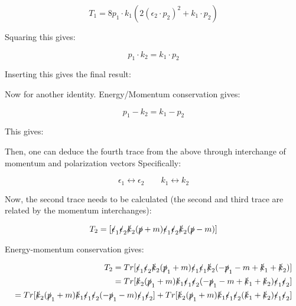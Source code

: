 \documentclass[a4]{article}
\begin{document}
    \begin{equation}
        T_1 = 8 p_1 \cdot k_1 (2 (\epsilon_2 \cdot p_2)^2 + k_1 \cdot p_2)
    \end{equation}

    Squaring this gives:

    \begin{equation}
        p_1 \cdot k_2 = k_1 \cdot p_2
    \end{equation}

    Inserting this gives the final result:

    \begin{center}
    \end{center}

    Now for another identity. Energy/Momentum conservation gives:

    \begin{equation}
        p_1 - k_2 = k_1 - p_2
    \end{equation}

    This gives:

    \begin{center}
    \end{center}

    Then, one can deduce the fourth trace from the above through interchange of momentum and polarization vectors Specifically:

    \[
        \epsilon_1 \leftrightarrow \epsilon_2 \qquad k_1 \leftrightarrow k_2
    \]

    Now, the second trace needs to be calculated (the second and third trace are related by the momentum interchanges):

    \begin{equation}
        T_2 = [\slashed{\epsilon}_1 \slashed{\epsilon}_2 \slashed{k}_2 (\slashed{p} + m) \slashed{\epsilon}_1 \slashed{\epsilon}_2 \slashed{k}_2 (\slashed{p} - m)]
    \end{equation}

    Energy-momentum conservation gives:

    \begin{eqnarray}
        T_2 = Tr [\slashed{\epsilon}_1 \slashed{\epsilon}_2 \slashed{k}_2 (\slashed{p}_1 + m) \slashed{\epsilon}_1 \slashed{\epsilon}_1 \slashed{k}_2 (- \slashed{p}_1 - m + \slashed{k}_1 + \slashed{k}_2)] \\
        = Tr [\slashed{k}_2 (\slashed{p}_1 + m) \slashed{k}_1 \slashed{\epsilon}_1 \slashed{\epsilon}_2 (- \slashed{p}_1 - m + \slashed{k}_1 + \slashed{k}_2) \slashed{\epsilon}_1 \slashed{\epsilon}_2] \\
        = Tr [\slashed{k}_2 (\slashed{p}_1 + m) \slashed{k}_1 \slashed{\epsilon}_1 \slashed{\epsilon}_2 (- \slashed{p}_1 - m) \slashed{\epsilon}_1 \slashed{\epsilon}_2] + Tr[\slashed{k}_2 (\slashed{p}_1 + m) \slashed{k}_1 \slashed{\epsilon}_1 \slashed{\epsilon}_2  (\slashed{k}_1 + \slashed{k}_2) \slashed{\epsilon}_1 \slashed{\epsilon}_2]
    \end{eqnarray}
\end{document}
